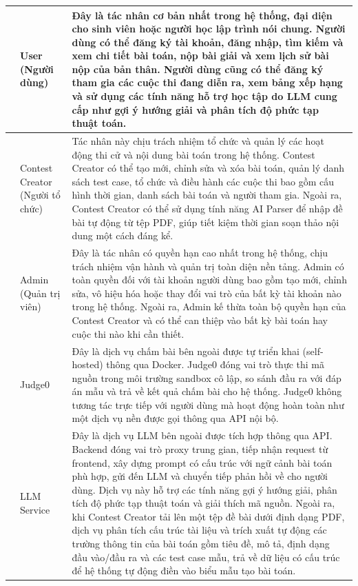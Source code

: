 \documentclass[12pt, a4paper]{report}
\begin{document}
\begin{longtable}{|>{\centering\arraybackslash}p{1.5cm}|>{\raggedright\arraybackslash}p{4.2cm}|>{\raggedright\arraybackslash}p{7.8cm}|}
  1 & User (Người dùng) &
    Đây là tác nhân cơ bản nhất trong hệ thống, đại diện cho sinh viên hoặc người học lập
    trình nói chung. Người dùng có thể đăng ký tài khoản, đăng nhập, tìm kiếm và xem chi
    tiết bài toán, nộp bài giải và xem lịch sử bài nộp của bản thân. Người dùng cũng có
    thể đăng ký tham gia các cuộc thi đang diễn ra, xem bảng xếp hạng và sử dụng các tính
    năng hỗ trợ học tập do \ac{LLM} cung cấp như gợi ý hướng giải và phân tích độ phức tạp
    thuật toán. \\
  \hline
  2 & Contest Creator (Người tổ chức) &
    Tác nhân này chịu trách nhiệm tổ chức và quản lý các hoạt động thi cử và nội dung bài
    toán trong hệ thống. Contest Creator có thể tạo mới, chỉnh sửa và xóa bài toán, quản
    lý danh sách test case, tổ chức và điều hành các cuộc thi bao gồm cấu hình thời gian,
    danh sách bài toán và người tham gia. Ngoài ra, Contest Creator có thể sử dụng tính
    năng AI Parser để nhập đề bài tự động từ tệp \ac{PDF}, giúp tiết kiệm thời gian soạn
    thảo nội dung một cách đáng kể. \\
  \hline
  3 & Admin (Quản trị viên) &
    Đây là tác nhân có quyền hạn cao nhất trong hệ thống, chịu trách nhiệm vận hành và
    quản trị toàn diện nền tảng. Admin có toàn quyền đối với tài khoản người dùng bao gồm
    tạo mới, chỉnh sửa, vô hiệu hóa hoặc thay đổi vai trò của bất kỳ tài khoản nào trong
    hệ thống. Ngoài ra, Admin kế thừa toàn bộ quyền hạn của Contest Creator và có thể can
    thiệp vào bất kỳ bài toán hay cuộc thi nào khi cần thiết. \\
  \hline
  4 & Judge0 &
    Đây là dịch vụ chấm bài bên ngoài được tự triển khai (self-hosted) thông qua Docker.
    Judge0 đóng vai trò thực thi mã nguồn trong môi trường sandbox cô lập, so sánh đầu ra
    với đáp án mẫu và trả về kết quả chấm bài cho hệ thống. Judge0 không tương tác trực
    tiếp với người dùng mà hoạt động hoàn toàn như một dịch vụ nền được gọi thông qua
    \ac{API} nội bộ. \\
  \hline
  5 & LLM Service &
    Đây là dịch vụ \ac{LLM} bên ngoài được tích hợp thông qua \ac{API}. Backend đóng vai
    trò proxy trung gian, tiếp nhận request từ frontend, xây dựng prompt có cấu trúc với
    ngữ cảnh bài toán phù hợp, gửi đến \ac{LLM} và chuyển tiếp phản hồi về cho người dùng.
    Dịch vụ này hỗ trợ các tính năng gợi ý hướng giải, phân tích độ phức tạp thuật toán và
    giải thích mã nguồn. Ngoài ra, khi Contest Creator tải lên một tệp đề bài dưới định dạng
    \ac{PDF}, dịch vụ phân tích cấu trúc tài liệu và trích xuất tự động các trường thông tin
    của bài toán gồm tiêu đề, mô tả, định dạng đầu vào/đầu ra và các test case mẫu, trả về dữ liệu
    có cấu trúc để hệ thống tự động điền vào biểu mẫu tạo bài toán. \\

\end{longtable}
\end{document}
